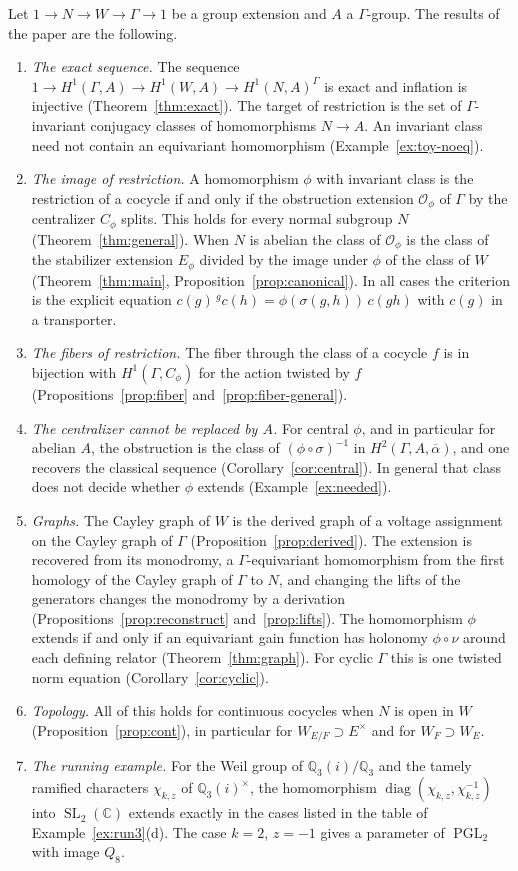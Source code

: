 \documentclass[12pt,letterpaper]{article}
\numberwithin{equation}{section}
\theoremstyle{plain}
\theoremstyle{definition}
\newcommand{\C}{\mathbb{C}}
\newcommand{\Q}{\mathbb{Q}}
\newcommand{\act}[2]{{}^{#1}\!#2}          %
\DeclareMathOperator{\SL}{SL}
\DeclareMathOperator{\PGL}{PGL}
\DeclareMathOperator{\diag}{diag}
\begin{document}
Let $1\to N\to W\to\Gamma\to1$ be a group extension and $A$ a
$\Gamma$-group. The results of the paper are the following.
\begin{enumerate}[itemsep=2pt]
\item \emph{The exact sequence.} The sequence
$1\to H^1(\Gamma,A)\to H^1(W,A)\to H^1(N,A)^\Gamma$ is exact and inflation
is injective (Theorem~\ref{thm:exact}). The target of restriction is the
set of $\Gamma$-invariant conjugacy classes of homomorphisms $N\to A$. An
invariant class need not contain an equivariant homomorphism
(Example~\ref{ex:toy-noeq}).
\item \emph{The image of restriction.} A homomorphism $\phi$ with
invariant class is the restriction of a cocycle if and only if the
obstruction extension $\mathcal{O}_\phi$ of $\Gamma$ by the centralizer
$C_\phi$ splits. This holds for every normal subgroup $N$
(Theorem~\ref{thm:general}). When $N$ is abelian the class of
$\mathcal{O}_\phi$ is the class of the stabilizer extension $E_\phi$
divided by the image under $\phi$ of the class of $W$
(Theorem~\ref{thm:main}, Proposition~\ref{prop:canonical}). In all cases
the criterion is the explicit equation
$c(g)\,\act{g}{c(h)}=\phi(\sigma(g,h))\,c(gh)$ with $c(g)$ in a
transporter.
\item \emph{The fibers of restriction.} The fiber through the class of a
cocycle $f$ is in bijection with $H^1(\Gamma,C_\phi)$ for the action
twisted by $f$ (Propositions~\ref{prop:fiber}
and~\ref{prop:fiber-general}).
\item \emph{The centralizer cannot be replaced by $A$.} For central
$\phi$, and in particular for abelian $A$, the obstruction is the class of
$(\phi\circ\sigma)^{-1}$ in $H^2(\Gamma,A,\overline{\alpha})$, and one
recovers the classical sequence (Corollary~\ref{cor:central}). In general
that class does not decide whether $\phi$ extends
(Example~\ref{ex:needed}).
\item \emph{Graphs.} The Cayley graph of $W$ is the derived graph of a
voltage assignment on the Cayley graph of $\Gamma$
(Proposition~\ref{prop:derived}). The extension is recovered from its
monodromy, a $\Gamma$-equivariant homomorphism from the first homology of
the Cayley graph of $\Gamma$ to $N$, and changing the lifts of the
generators changes the monodromy by a derivation
(Propositions~\ref{prop:reconstruct} and~\ref{prop:lifts}). The
homomorphism $\phi$ extends if and only if an equivariant gain function
has holonomy $\phi\circ\nu$ around each defining relator
(Theorem~\ref{thm:graph}). For cyclic $\Gamma$ this is one twisted norm
equation (Corollary~\ref{cor:cyclic}).
\item \emph{Topology.} All of this holds for continuous cocycles when $N$
is open in $W$ (Proposition~\ref{prop:cont}), in particular for
$W_{E/F}\supset E^\times$ and for $W_F\supset W_E$.
\item \emph{The running example.} For the Weil group of $\Q_3(i)/\Q_3$
and the tamely ramified characters $\chi_{k,z}$ of $\Q_3(i)^\times$, the
homomorphism $\diag(\chi_{k,z},\chi_{k,z}^{-1})$ into $\SL_2(\C)$ extends
exactly in the cases listed in the table of Example~\ref{ex:run3}(d). The
case $k=2$, $z=-1$ gives a parameter of $\PGL_2$ with image $Q_8$.
\end{enumerate}
\end{document}
